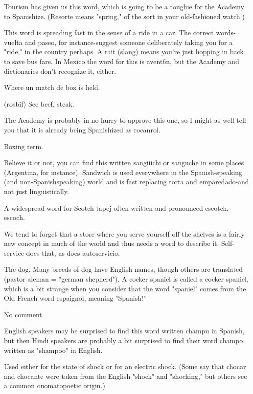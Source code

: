 Tourism has given us this word, which is going to
be a toughie for the Academy to Spanishize. (Resorte means "spring,"
of the sort in your old-fashioned watch.)

 This word is spreading fast in the sense of a ride in a
car. The correct words-vuelta and paseo, for instance-suggest someone deliberately taking you for a "ride," in the country perhaps. A rait
(slang) means you're just hopping in back to save bus fare. In Mexico
the word for this is avent6n, but the Academy and dictionaries don't
recognize it, either.

 Where un match de box is held.

 (rosbif) See beef, steak.

 The Academy is probably in no
hurry to approve this one, so I might as well tell you that it is already being Spanishized as rocanrol.

 Boxing term.

 Believe it or not, you can find this written sangiiichi or sanguche in some places (Argentina, for instance). Sandwich is used everywhere in the Spanish-speaking (and non-Spanishspeaking) world and is fast replacing torta and emparedado-and not
just linguistically.

 A widespread word for Scotch tapej often written
and pronounced escotch, escoch.

 We tend to forget that a store where you serve
yourself off the shelves is a fairly new concept in much of the world
and thus needs a word to describe it. Self-service does that, as does
autoservicio.

 The dog. Many breeds of dog have English names,
though others are translated (pastor aleman = "german shepherd"). A
cocker spaniel is called a cocker spaniel, which is a bit strange when
you consider that the word "spaniel" comes from the Old French word
espaignol, meaning "Spanish!"

 No comment.

 English speakers may be surprised to find this
word written champu in Spanish, but then Hindi speakers are probably
a bit surprised to find their word champo written as "shampoo" in
English.

 Used either for the state of shock or for an electric
shock. (Some say that chocar and chocante were taken from the English "shock" and "shocking," but others see a common onomatopoetic origin.)

